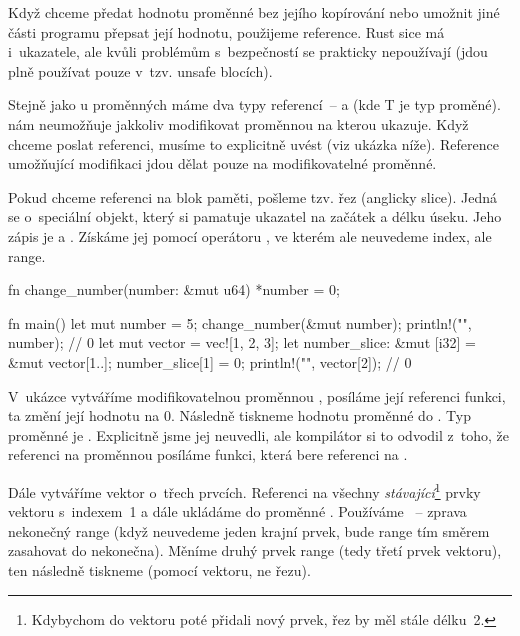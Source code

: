 \documentclass[main.tex]{subfiles}
\begin{document}
Když chceme předat hodnotu proměnné bez jejího kopírování nebo umožnit jiné části programu
přepsat její hodnotu, použijeme reference. Rust sice má i~ukazatele, ale kvůli problémům
s~bezpečností se prakticky nepoužívají (jdou plně používat pouze v~tzv. unsafe blocích).

Stejně jako u proměnných máme dva typy referencí~--  a  (kde T je
typ proměné).  nám neumožňuje jakkoliv modifikovat proměnnou na kterou ukazuje.
Když chceme poslat referenci, musíme to explicitně uvést (viz ukázka níže). Reference
umožňující modifikaci jdou dělat pouze na modifikovatelné proměnné.

Pokud chceme referenci na blok paměti, pošleme tzv. řez (anglicky slice). Jedná se
o~speciální objekt, který si pamatuje ukazatel na začátek a délku úseku. Jeho zápis je
\irust{&[T]} a . Získáme jej pomocí operátoru \irust{[]}, ve kterém ale
neuvedeme index, ale range.

\obrazek
\begin{rustcode}
    fn change_number(number: &mut u64) {
        *number = 0;
    }

    fn main() {
        let mut number = 5;
        change_number(&mut number);
        println!("{}", number); // 0
        let mut vector = vec![1, 2, 3];
        let number_slice: &mut [i32] = &mut vector[1..];
        number_slice[1] = 0;
        println!("{}", vector[2]); // 0
    }
\end{rustcode}

V~ukázce vytváříme modifikovatelnou proměnnou , posíláme její referenci
funkci, ta změní její hodnotu na 0. Následně tiskneme hodnotu proměnné do .
Typ proměnné je . Explicitně jsme jej neuvedli, ale kompilátor si to odvodil
z~toho, že referenci na proměnnou posíláme funkci, která bere referenci na .

Dále vytváříme vektor o~třech prvcích. Referenci na všechny \emph{stávající}\footnote{
    Kdybychom do vektoru poté přidali nový prvek, řez by měl stále délku~2.
} prvky vektoru s~indexem~1 a dále ukládáme do proměnné . Používáme
~-- zprava nekonečný range (když neuvedeme jeden krajní prvek, bude range tím
směrem zasahovat do nekonečna). Měníme druhý prvek range (tedy třetí prvek vektoru), ten
následně tiskneme (pomocí vektoru, ne řezu).

\end{document}
